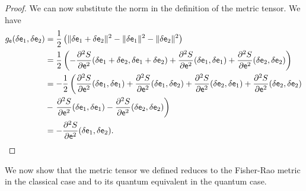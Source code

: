 \begin{mathSection}
\begin{proof}
	We can now substitute the norm in the definition of the metric tensor. We have
	\begin{equation}
		\begin{aligned}
			g_{\mathsf{e}}(\delta \mathsf{e}_1, \delta \mathsf{e}_2 ) &= \frac{1}{2} \left( \lVert \delta \mathsf{e}_1 + \delta \mathsf{e}_2 \rVert^2 - \lVert \delta \mathsf{e}_1 \rVert^2 - \lVert \delta \mathsf{e}_2 \rVert^2 \right) \\
			&= \frac{1}{2} \left( - \frac{\partial^2 S}{\partial \mathsf{e}^2} (\delta \mathsf{e}_1 + \delta \mathsf{e}_2, \delta \mathsf{e}_1 + \delta \mathsf{e}_2) + \frac{\partial^2 S}{\partial \mathsf{e}^2} (\delta \mathsf{e}_1, \delta \mathsf{e}_1) + \frac{\partial^2 S}{\partial \mathsf{e}^2} (\delta \mathsf{e}_2, \delta \mathsf{e}_2) \right) \\
			&= - \frac{1}{2} \left(  \frac{\partial^2 S}{\partial \mathsf{e}^2} (\delta \mathsf{e}_1, \delta \mathsf{e}_1) + \frac{\partial^2 S}{\partial \mathsf{e}^2} (\delta \mathsf{e}_1, \delta \mathsf{e}_2) + \frac{\partial^2 S}{\partial \mathsf{e}^2} (\delta \mathsf{e}_2, \delta \mathsf{e}_1) + \frac{\partial^2 S}{\partial \mathsf{e}^2} (\delta \mathsf{e}_2, \delta \mathsf{e}_2) \right. \\
			&-  \left. \frac{\partial^2 S}{\partial \mathsf{e}^2} (\delta \mathsf{e}_1, \delta \mathsf{e}_1) - \frac{\partial^2 S}{\partial \mathsf{e}^2} (\delta \mathsf{e}_2, \delta \mathsf{e}_2) \right) \\
			&= - \frac{\partial^2 S}{\partial \mathsf{e}^2} (\delta \mathsf{e}_1, \delta \mathsf{e}_2). \\
		\end{aligned}
	\end{equation}
\end{proof}
\end{mathSection}

We now show that the metric tensor we defined reduces to the Fisher-Rao metric in the classical case and to its quantum equivalent in the quantum case.

